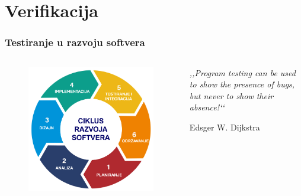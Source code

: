 \documentclass{beamer}
\begin{document}
\section{Verifikacija}
\begin{frame}
\frametitle{Testiranje u razvoju softvera}
\begin{columns}[c] %
\begin{figure}
\includegraphics[width=1\linewidth]{rs.png}
\end{figure}

\epigraph{\emph{,,Program testing can be used to show the presence of bugs, but never to show their absence!‘‘}}{Edsger W. Dijkstra}

\end{columns}
\end{frame}
\end{document}
